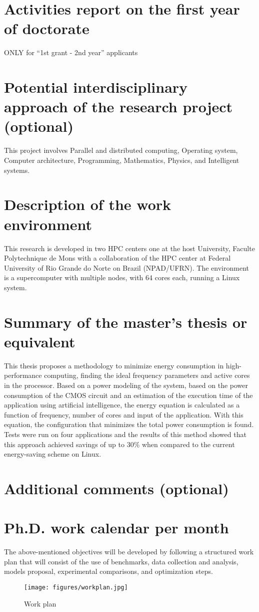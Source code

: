 \section{Activities report on the first year of doctorate}
ONLY for “1st grant - 2nd year” applicants

\section{Potential interdisciplinary approach of the research project (optional)}
This project involves Parallel and distributed computing, Operating system, Computer architecture, Programming, Mathematics, Physics, and Intelligent systems.

\section{Description of the work environment}
This research is developed in two HPC centers one at the host University, Faculte Polytechnique de Mons with a collaboration of the HPC center at Federal University of Rio Grande do Norte on Brazil (NPAD/UFRN). The environment is a supercomputer with multiple nodes, with 64 cores each, running a Linux system.

\section{Summary of the master’s thesis or equivalent}

This thesis proposes a methodology to minimize energy consumption in high-performance computing, finding the ideal frequency parameters and active cores in the processor. Based on a power modeling of the system, based on the power consumption of the CMOS circuit and an estimation of the execution time of the application using artificial intelligence, the energy equation is calculated as a function of frequency, number of cores and input of the application. With this equation, the configuration that minimizes the total power consumption is found. Tests were run on four applications and the results of this method showed that this approach achieved savings of up to 30\% when compared to the current energy-saving scheme on Linux.

\section{Additional comments (optional)}


\section{Ph.D. work calendar per month}

The above-mentioned objectives will be developed by following a structured work plan that will consist of the use of benchmarks, data collection and analysis, models proposal, experimental comparisons, and optimization steps. 

\begin{figure}[h]
    \centering
    \texttt{[image: figures/workplan.jpg]}
    \caption{Work plan}
    \label{fig:workplan}
\end{figure}
